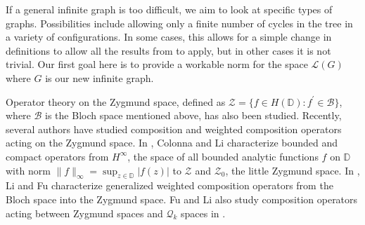 \documentclass[11 pt]{report}
\theoremstyle{definition}
\theoremstyle{definition}
\begin{document}
\begin{figure}
\begin{center}
\caption{}
\end{center}
\end{figure}



\indent If a general infinite graph is too difficult, we aim to look at specific types of graphs. Possibilities include allowing only a finite number of cycles in the tree in a variety of configurations. In some cases, this allows for a simple change in definitions to allow all the results from \cite{Tree} to apply, but in other cases it is not trivial. Our first goal here is to provide a workable norm for the space $\mathcal{L}(G)$ where $G$ is our new infinite graph.

\indent Operator theory on the Zygmund space, defined as $\mathcal{Z} = \{f \in H(\mathbb{D}): f^\prime \in \mathcal{B}\}$, where $\mathcal{B}$ is the Bloch space mentioned above, has also been studied. Recently, several authors have studied composition and weighted composition operators acting on the Zygmund space. In \cite{Zyg1}, Colonna and Li characterize bounded and compact operators from $H^\infty$, the space of all bounded analytic functions $f$ on $\mathbb{D}$ with norm $\|f\|_\infty = \sup_{z \in \mathbb{D}} |f(z)|$ to $\mathcal{Z}$ and $\mathcal{Z}_0$, the little Zygmund space. In \cite{Zyg2}, Li and Fu characterize generalized weighted composition operators from the Bloch space into the Zygmund space. Fu and Li also study composition operators acting between Zygmund spaces and $\mathcal{Q}_k$ spaces in \cite{Zyg3}.
\end{document}
